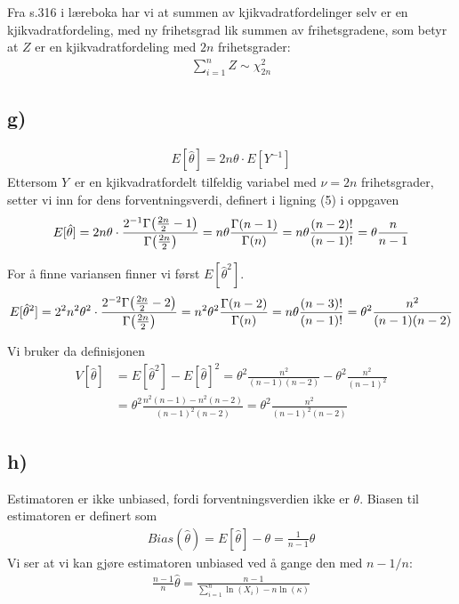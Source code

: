 \documentclass[12p,a4paper]{article}
\begin{document}
Fra s.316 i læreboka har vi at summen av kjikvadratfordelinger selv er en kjikvadratfordeling, med ny frihetsgrad lik summen av frihetsgradene, som betyr at $Z$ er en kjikvadratfordeling med $2n$ frihetsgrader:
\begin{align*}
    \sum_{i=1}^n Z \sim \chi_{2n}^2
\end{align*}


\subsection*{g)}
\begin{align*}
    E[\hat{\theta}] = 2n\theta \cdot E[Y^{-1}]
\end{align*}
Ettersom $Y$ er en kjikvadratfordelt tilfeldig variabel med $\nu = 2n$ frihetsgrader, setter vi inn for dens forventningsverdi, definert i ligning (5) i oppgaven
\begin{align*}
    E[\hat{\theta}] = 2n\theta \cdot \frac{2^{-1} \Gamma\qty(\frac{2n}{2} - 1)}{\Gamma\qty(\frac{2n}{2})} = n\theta\frac{\Gamma\qty(n - 1)}{\Gamma\qty(n)} = n\theta \frac{(n-2)!}{(n-1)!} = \theta\frac{n}{n-1}
\end{align*}

For å finne variansen finner vi først $E[\hat{\theta}^2]$.
\begin{align*}
    E[\hat{\theta}^2] = 2^2n^2\theta^2\cdot \frac{2^{-2} \Gamma\qty(\frac{2n}{2} - 2)}{\Gamma\qty(\frac{2n}{2})} = n^2\theta^2\frac{\Gamma\qty(n - 2)}{\Gamma\qty(n)} = n\theta \frac{(n-3)!}{(n-1)!} = \theta^2\frac{n^2}{(n-1)(n-2)}
\end{align*}

Vi bruker da definisjonen
\begin{align*}
    V[\hat{\theta}] &= E[\hat{\theta}^2] - E[\hat{\theta}]^2
    = \theta^2\frac{n^2}{(n-1)(n-2)} - \theta^2\frac{n^2}{(n-1)^2} \\
    &= \theta^2\frac{n^2(n-1) - n^2(n-2)}{(n-1)^2(n-2)} = \theta^2\frac{n^2}{(n-1)^2(n-2)}
\end{align*}


\subsection*{h)}
Estimatoren er ikke unbiased, fordi forventningsverdien ikke er $\theta$. Biasen til estimatoren er definert som
\begin{align*}
    Bias(\hat{\theta}) = E[\hat{\theta}] - \theta = \frac{1}{n-1}\theta
\end{align*}
Vi ser at vi kan gjøre estimatoren unbiased ved å gange den med $n-1/n$:
\begin{align*}
    \frac{n-1}{n}\hat{\theta} = \frac{n-1}{\sum_{i=1}^n\ln(X_i) - n\ln(\kappa)}
\end{align*}
\end{document}
